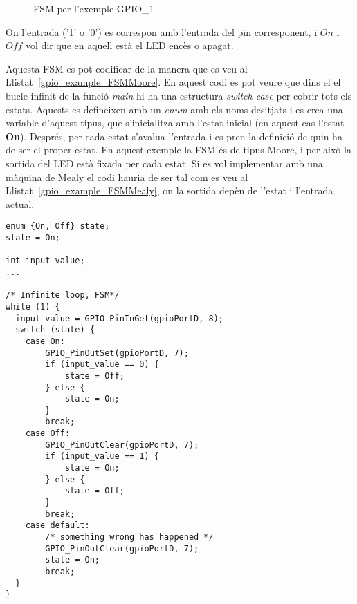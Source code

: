 \begin{figure}[h!]
\centering
 \caption{FSM per l'exemple GPIO\_1}
 \label{fig:FSM_GPIO1}
\end{figure}

On l'entrada ('1' o '0') es correspon amb l'entrada del pin corresponent, i $On$ i $Off$ vol dir que en aquell està el LED encès o apagat. 

Aquesta FSM es pot codificar de la manera que es veu al Llistat~\ref{gpio_example_FSMMoore}. En aquest codi es pot veure que dins el el bucle infinit de la funció {\em main} hi ha una estructura {\em switch-case} per cobrir tots els estats. Aquests es defineixen amb un {\em enum} amb els noms desitjats i es crea una variable d'aquest tipus, que s'inicialitza amb l'estat inicial (en aquest cas l'estat {\bf On}). Després, per cada estat s'avalua l'entrada i es pren la definició de quin ha de ser el proper estat. En aquest exemple la FSM és de tipus Moore, i per això la sortida del LED està fixada per cada estat. Si es vol implementar amb una màquina de Mealy el codi hauria de ser tal com es veu al Llistat~\ref{gpio_example_FSMMealy}, on la sortida depèn de l'estat i l'entrada actual.

\begin{lstlisting}[style=customc,caption={Codi d'exemple de GPIO},label=gpio_example_FSMMoore]
enum {On, Off} state;
state = On;

int input_value;
...

/* Infinite loop, FSM*/
while (1) {
  input_value = GPIO_PinInGet(gpioPortD, 8);
  switch (state) {
    case On:
        GPIO_PinOutSet(gpioPortD, 7);
        if (input_value == 0) {
            state = Off;
        } else {
            state = On;
        }
        break;
    case Off:
        GPIO_PinOutClear(gpioPortD, 7);
        if (input_value == 1) {
            state = On;
        } else {
            state = Off;
        }
        break;
    case default:
        /* something wrong has happened */
        GPIO_PinOutClear(gpioPortD, 7);
        state = On;
        break;
  }
}
\end{lstlisting}


